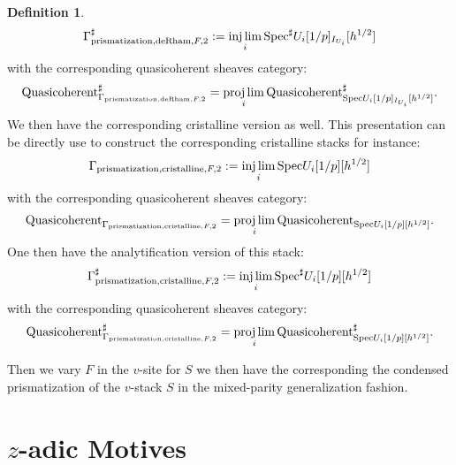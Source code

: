 \documentclass[12pt]{article}
\theoremstyle{definition}
\newtheorem{definition}{Definition}
\begin{document}
\begin{definition}
\begin{align}
\mathrm{\Gamma}^\sharp_{\mathrm{prismatization},\mathrm{deRham},F,2}:=\injlim_i \mathrm{Spec}^\sharp U_i[1/p]_{I_{U_i}}[h^{1/2}]
\end{align}
with the corresponding quasicoherent sheaves category:
\begin{align}
\mathrm{Quasicoherent}^\sharp_{\mathrm{\Gamma}_{\mathrm{prismatization},\mathrm{deRham},F,2}}=\projlim_i \mathrm{Quasicoherent}^\sharp_{\mathrm{Spec}U_i[1/p]_{I_{U_i}}[h^{1/2}]}.
\end{align}
We then have the corresponding cristalline version as well. This presentation can be directly use to construct the corresponding cristalline stacks for instance:
\begin{align}
\mathrm{\Gamma}_{\mathrm{prismatization},\mathrm{cristalline},F,2}:=\injlim_i \mathrm{Spec}U_i[1/p][h^{1/2}]
\end{align}
with the corresponding quasicoherent sheaves category:
\begin{align}
\mathrm{Quasicoherent}_{\mathrm{\Gamma}_{\mathrm{prismatization},\mathrm{cristalline},F,2}}=\projlim_i \mathrm{Quasicoherent}_{\mathrm{Spec}U_i[1/p][h^{1/2}]}.
\end{align}
One then have the analytification version of this stack:
\begin{align}
\mathrm{\Gamma}^\sharp_{\mathrm{prismatization},\mathrm{cristalline},F,2}:=\injlim_i \mathrm{Spec}^\sharp U_i[1/p][h^{1/2}]
\end{align}
with the corresponding quasicoherent sheaves category:
\begin{align}
\mathrm{Quasicoherent}^\sharp_{\mathrm{\Gamma}_{\mathrm{prismatization},\mathrm{cristalline},F,2}}=\projlim_i \mathrm{Quasicoherent}^\sharp_{\mathrm{Spec}U_i[1/p][h^{1/2}]}.
\end{align} 
\end{definition}


\indent Then we vary $F$ in the $v$-site for $S$ we then have the corresponding the condensed prismatization of the $v$-stack $S$ in the mixed-parity generalization fashion.



\newpage
\section{$z$-adic Motives}
\end{document}
